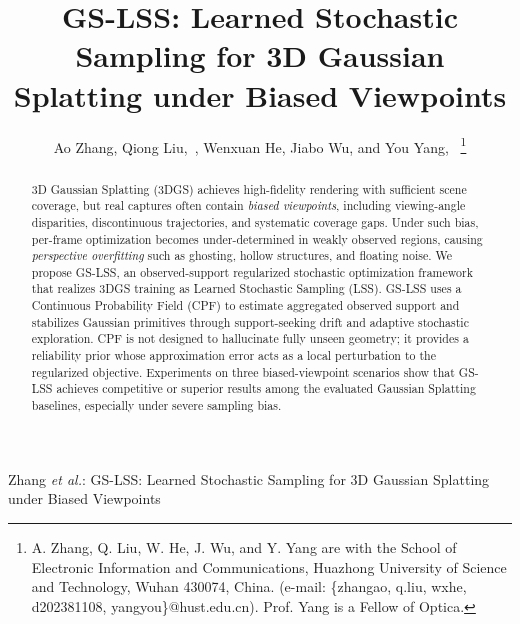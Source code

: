 \documentclass[lettersize,journal]{IEEEtran}
\begin{document}
\title{GS-LSS: Learned Stochastic Sampling for 3D Gaussian Splatting under Biased Viewpoints}

\author{Ao Zhang,
Qiong Liu,~, 
Wenxuan He, Jiabo Wu,
and You Yang,~
\thanks{A. Zhang, Q. Liu, W. He, J. Wu, and Y. Yang are with the School of Electronic Information and Communications, Huazhong University of Science and Technology, Wuhan 430074, China. (e-mail: \{zhangao, q.liu, wxhe, d202381108, yangyou\}@hust.edu.cn). Prof. Yang is a Fellow of Optica.}
}

%
{Zhang \MakeLowercase{\textit{et al.}}: GS-LSS: Learned Stochastic Sampling for 3D Gaussian Splatting under Biased Viewpoints}


\maketitle



\begin{abstract}
3D Gaussian Splatting (3DGS) achieves high-fidelity rendering with sufficient scene coverage, but real captures often contain \textit{biased viewpoints}, including viewing-angle disparities, discontinuous trajectories, and systematic coverage gaps. Under such bias, per-frame optimization becomes under-determined in weakly observed regions, causing \emph{perspective overfitting} such as ghosting, hollow structures, and floating noise.
We propose GS-LSS, an observed-support regularized stochastic optimization framework that realizes 3DGS training as Learned Stochastic Sampling (LSS). GS-LSS uses a Continuous Probability Field (CPF) to estimate aggregated observed support and stabilizes Gaussian primitives through support-seeking drift and adaptive stochastic exploration.
CPF is not designed to hallucinate fully unseen geometry; it provides a reliability prior whose approximation error acts as a local perturbation to the regularized objective. Experiments on three biased-viewpoint scenarios show that GS-LSS achieves competitive or superior results among the evaluated Gaussian Splatting baselines, especially under severe sampling bias.
\end{abstract}
\end{document}
